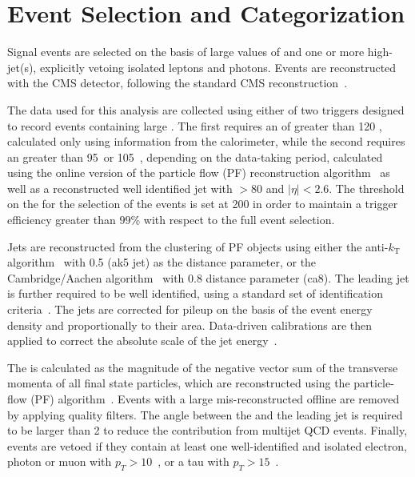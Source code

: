 \section{Event Selection and Categorization}\label{sec:selection}

Signal events are selected on the basis of large values of \ETm and one or more high-\pt jet(s), 
explicitly vetoing isolated leptons and photons. Events are
reconstructed with the CMS detector, following the standard CMS reconstruction~\cite{CMSdetector}. 

The data used for this analysis are collected using either of two triggers designed to record events containing large \ETm. The first requires an \ETm of greater than 120 \gev, calculated only using information from the calorimeter, 
while the second requires an \ETm greater than 95~\gev or 105~\gev, depending on the data-taking period, calculated using the online version of 
the particle flow (PF) reconstruction algorithm~\cite{CMS-PAS-PFT-09-001} as well as a reconstructed well identified jet with \pt$>80$ \gev and $|\eta|<2.6$. 
The threshold on the \ETm for the selection of the events is set at 200 \gev in order to maintain a trigger efficiency greater than 
$99$\% with respect to the full event selection. 

Jets are reconstructed from the clustering of PF objects using either the 
anti-$k_{\textrm{T}}$ algorithm~\cite{Cacciari:2008gp} with 0.5 (ak5 jet) as the distance parameter,  
or the Cambridge/Aachen algorithm~\cite{cajets} with 0.8 distance
parameter (ca8). The leading jet is further required to be well
identified, using a standard set of identification criteria~\cite{jec}. The jets are corrected for pileup on the basis of the event energy density and 
proportionally to their area. Data-driven calibrations are then applied to correct the absolute scale of the jet energy~\cite{jec}.

The \ETm is calculated as the magnitude of the negative 
vector sum of the transverse momenta of all final state particles, which are reconstructed 
using the particle-flow (PF) algorithm~\cite{CMS-PAS-PFT-09-001}.
Events with a large mis-reconstructed offline \ETm are removed by applying quality filters. 
The angle between the \ETm and the leading jet is required to be larger than 2 to reduce the contribution from multijet QCD events. 
Finally, events are vetoed if they contain at least one well-identified and isolated electron, photon or muon with $p_T>10$~\gev, or a tau with $p_T>15$~\gev.


